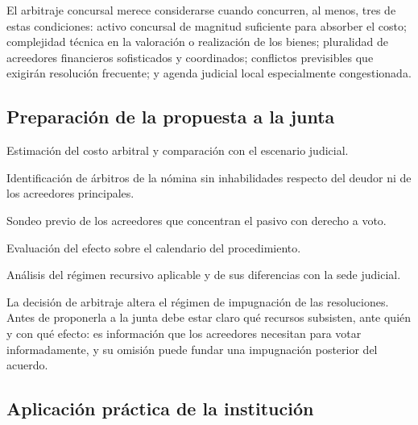 \begin{foco}
El arbitraje concursal merece considerarse cuando concurren, al menos, tres de estas
condiciones: activo concursal de magnitud suficiente para absorber el costo; complejidad
técnica en la valoración o realización de los bienes; pluralidad de acreedores
financieros sofisticados y coordinados; conflictos previsibles que exigirán resolución
frecuente; y agenda judicial local especialmente congestionada.
\end{foco}

\subsection{Preparación de la propuesta a la junta}

\begin{checklist}
  \item Estimación del costo arbitral y comparación con el escenario judicial.
  \item Identificación de árbitros de la nómina sin inhabilidades respecto del deudor ni
  de los acreedores principales.
  \item Sondeo previo de los acreedores que concentran el pasivo con derecho a voto.
  \item Evaluación del efecto sobre el calendario del procedimiento.
  \item Análisis del régimen recursivo aplicable y de sus diferencias con la sede
  judicial.
\end{checklist}

\begin{practica}
La decisión de arbitraje altera el régimen de impugnación de las resoluciones. Antes de
proponerla a la junta debe estar claro qué recursos subsisten, ante quién y con qué
efecto: es información que los acreedores necesitan para votar informadamente, y su
omisión puede fundar una impugnación posterior del acuerdo.
\end{practica}

\bloqueJurisprudencial

\subsection{Aplicación práctica de la institución}


